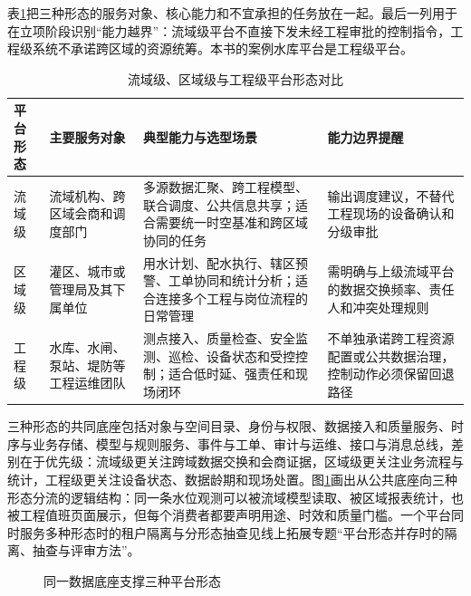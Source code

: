 表\ref{tab:ch01-platform-forms}把三种形态的服务对象、核心能力和不宜承担的任务放在一起。最后一列用于在立项阶段识别“能力越界”：流域级平台不直接下发未经工程审批的控制指令，工程级系统不承诺跨区域的资源统筹。本书的案例水库平台是工程级平台。

\begin{table}[htbp]
\centering
\caption{流域级、区域级与工程级平台形态对比}
\label{tab:ch01-platform-forms}
\begin{tabular}{p{2.2cm}p{3.0cm}p{4.6cm}p{4.0cm}}
\toprule
平台形态 & 主要服务对象 & 典型能力与选型场景 & 能力边界提醒 \\
\midrule
流域级 & 流域机构、跨区域会商和调度部门 & 多源数据汇聚、跨工程模型、联合调度、公共信息共享；适合需要统一时空基准和跨区域协同的任务 & 输出调度建议，不替代工程现场的设备确认和分级审批 \\
区域级 & 灌区、城市或管理局及其下属单位 & 用水计划、配水执行、辖区预警、工单协同和统计分析；适合连接多个工程与岗位流程的日常管理 & 需明确与上级流域平台的数据交换频率、责任人和冲突处理规则 \\
工程级 & 水库、水闸、泵站、堤防等工程运维团队 & 测点接入、质量检查、安全监测、巡检、设备状态和受控控制；适合低时延、强责任和现场闭环 & 不单独承诺跨工程资源配置或公共数据治理，控制动作必须保留回退路径 \\
\bottomrule
\end{tabular}
\end{table}

三种形态的共同底座包括对象与空间目录、身份与权限、数据接入和质量服务、时序与业务存储、模型与规则服务、事件与工单、审计与运维、接口与消息总线，差别在于优先级：流域级更关注跨域数据交换和会商证据，区域级更关注业务流程与统计，工程级更关注设备状态、数据龄期和现场处置。图\ref{fig:ch01-platform-forms}画出从公共底座向三种形态分流的逻辑结构：同一条水位观测可以被流域模型读取、被区域报表统计，也被工程值班页面展示，但每个消费者都要声明用途、时效和质量门槛。一个平台同时服务多种形态时的租户隔离与分形态抽查见线上拓展专题“平台形态并存时的隔离、抽查与评审方法”。

\begin{figure}[htbp]
\centering
{}
\caption{同一数据底座支撑三种平台形态}
\label{fig:ch01-platform-forms}
\end{figure}

